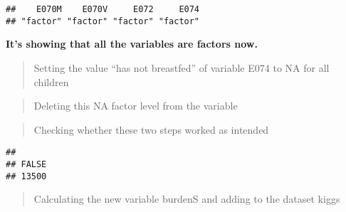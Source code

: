 \documentclass[
]{article}
\newenvironment{Shaded}{\begin{snugshade}}{\end{snugshade}}
\newcommand{\ConstantTok}[1]{\textcolor[rgb]{0.00,0.00,0.00}{#1}}
\newcommand{\FunctionTok}[1]{\textcolor[rgb]{0.00,0.00,0.00}{#1}}
\newcommand{\NormalTok}[1]{#1}
\newcommand{\OtherTok}[1]{\textcolor[rgb]{0.56,0.35,0.01}{#1}}
\newcommand{\SpecialCharTok}[1]{\textcolor[rgb]{0.00,0.00,0.00}{#1}}
\newcommand{\StringTok}[1]{\textcolor[rgb]{0.31,0.60,0.02}{#1}}
\begin{document}
\begin{verbatim}
##    E070M    E070V     E072     E074 
## "factor" "factor" "factor" "factor"
\end{verbatim}

\textbf{It's showing that all the variables are factors now.}

\begin{quote}
Setting the value ``has not breastfed'' of variable E074 to NA for all
children
\end{quote}

\begin{Shaded}
\end{Shaded}

\begin{quote}
Deleting this NA factor level from the variable
\end{quote}

\begin{Shaded}
\end{Shaded}

\begin{quote}
Checking whether these two steps worked as intended
\end{quote}

\begin{Shaded}
\end{Shaded}

\begin{verbatim}
## 
## FALSE 
## 13500
\end{verbatim}

\begin{quote}
Calculating the new variable burdenS and adding to the dataset kiggs
\end{quote}
\end{document}
